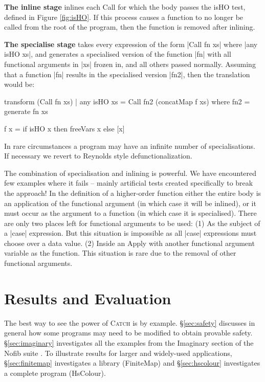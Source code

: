 \documentclass[preprint]{sigplanconf}
\let\cite=\citep
\newcommand{\C}[1]{\textsf{#1}}
\newcommand{\catch}{\textsc{Catch}}
\newcommand{\para}[1]{\vspace{2mm}\noindent\textbf{#1}}
\newcommand{\ignore}{}
\begin{document}
\para{The \C{inline} stage} inlines each \C{Call} for which the body passes the \C{isHO} test, defined in Figure \ref{fig:isHO}. If this process causes a function to no longer be called from the root of the program, then the function is removed after inlining.

\para{The \C{specialise} stage} takes every expression of the form |Call fn xs| where \ignore|any isHO xs|, and generates a specialised version of the function |fn| with all functional arguments in |xs| frozen in, and all others passed normally. Assuming that a function |fn| results in the specialised version |fn2|, then the translation would be:

\ignore\begin{code}
transform (Call fn xs) | any isHO xs =
    Call fn2 (concatMap f xs)
    where
    fn2 = generate fn xs

    f x = if isHO x then freeVars x else [x]
\end{code}

In rare circumstances a program may have an infinite number of specialisations. If necessary we revert to Reynolds style defunctionalization.

The combination of specialisation and inlining is powerful. We have encountered few examples where it fails -- mainly artificial tests created specifically to break the approach! In the definition of a higher-order function either the entire body is an application of the functional argument (in which case it will be inlined), or it must occur as the argument to a function (in which case it is specialised). There are only two places left for functional arguments to be used: (1) As the subject of a \ignore|case| expression. But this situation is impossible as all \ignore|case| expressions must choose over a data value. (2) Inside an \C{Apply} with another functional argument variable as the function. This situation is rare due to the removal of other functional arguments.

\section{Results and Evaluation}
\label{sec:results}

The best way to see the power of \catch{} is by example. \S\ref{sec:safety} discusses in general how some programs may need to be modified to obtain provable safety. \S\ref{sec:imaginary} investigates all the examples from the Imaginary section of the Nofib suite \cite{nofib}. To illustrate results for larger and widely-used applications, \S\ref{sec:finitemap} investigates a library (FiniteMap) and \S\ref{sec:hscolour} investigates a complete program (HsColour).
\end{document}

